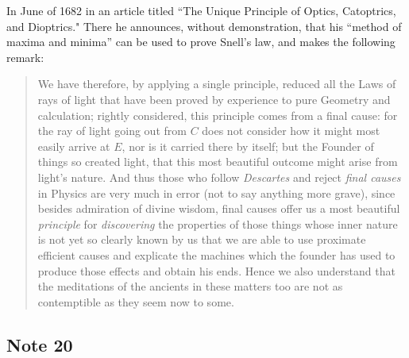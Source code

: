 \documentclass[polutonikogreek,english,twoside,openright]{article}
\begin{document}
In June of 1682 in an article titled ``The Unique Principle of Optics,
Catoptrics, and Dioptrics."  There he announces, without
demonstration, that his ``method of maxima and minima'' can be used to
prove Snell's law, and makes the following remark:
\begin{quote}
  We have therefore, by applying a single principle, reduced all the
  Laws of rays of light that have been proved by experience to pure
  Geometry and calculation; rightly considered, this principle comes
  from a final cause: for the ray of light going out from $C$ does not
  consider how it might most easily arrive at $E$, nor is it carried
  there by itself; but the Founder of things so created light, that
  this most beautiful outcome might arise from light's nature. And
  thus those who follow {\em Descartes} and reject {\em final causes}
  in Physics are very much in error (not to say anything more grave),
  since besides admiration of divine wisdom, final causes offer us a
  most beautiful {\em principle} for {\em discovering} the properties
  of those things whose inner nature is not yet so clearly known by us
  that we are able to use proximate efficient causes and explicate the
  machines which the founder has used to produce those effects and
  obtain his ends.  Hence we also understand that the meditations of
  the ancients in these matters too are not as contemptible as they
  seem now to some.
\end{quote}

\subsection*{Note 20}
\label{cnm20}
\end{document}
